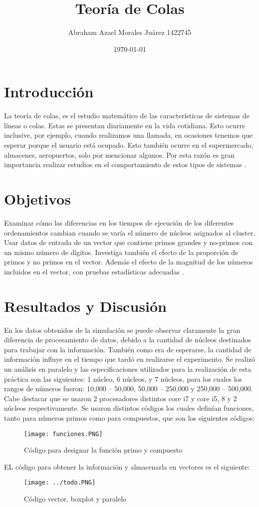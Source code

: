 \documentclass{article}
\author{Abraham Azael Morales Juárez  1422745}
\title{Teoría de Colas}
\date{\today}
\begin{document}
\maketitle

\section{Introducción}
La teoría de colas, es el estudio matemático de las características de sistemas de líneas o colas. Estas  se presentan diariamente en la vida cotidiana. Esto ocurre inclusive, por ejemplo, cuando realizamos una llamada, en ocasiones tenemos que esperar porque el usuario está ocupado. Esto también ocurre en el supermercado, almacenes, aeropuertos, solo por mencionar algunos. Por esta razón es gran importancia realizar estudios en el comportamiento de estos tipos de sistemas \cite{REF2}.

\section{Objetivos}
Examinar cómo las diferencias en los tiempos de ejecución de los diferentes ordenamientos cambian cuando se varía el número de núcleos asignados al cluster.
Usar datos de entrada de un vector que contiene primos grandes y no-primos con un mismo número de dígitos.
Investiga también el efecto de la proporción de primos y no primos en el vector.
Además el efecto de la magnitud de los números incluidos en el vector, con pruebas estadísticas adecuadas \cite{REF1}.

\section{Resultados y Discusión}
En los datos obtenidos de la simulación se puede observar claramente la gran diferencia de procesamiento de datos, debido a la cantidad de núcleos destinados para trabajar con la información.  También como era de esperarse, la cantidad de información influye en el tiempo que tardó en realizarse el experimento.
Se realizó un análisis en paralelo y las especificaciones utilizados para la realización de esta práctica son las siguientes: 1 núcleo, 6 núcleos, y 7 núcleos, para los cuales los rangos de números fueron: 10,000 – 50,000, 50,000 – 250,000 y 250,000 – 500,000. Cabe destacar que se usaron 2 procesadores distintos core i7 y core i5, 8 y 2 núcleos respectivamente.
Se usaron distintos códigos los cuales definían funciones, tanto para números primos como para compuestos, que son los siguientes códigos:
\begin{figure}[hbtp]
\centering
\texttt{[image: funciones.PNG]}
\caption{Código para designar la función primo y compuesto}
\end{figure}
EL código para obtener la información y almacenarla en vectores es el siguiente:
\begin{figure}[hbtp]
\centering
\texttt{[image: ../todo.PNG]}
\caption{Código vector, boxplot y paralelo}
\end{figure}
\end{document}
